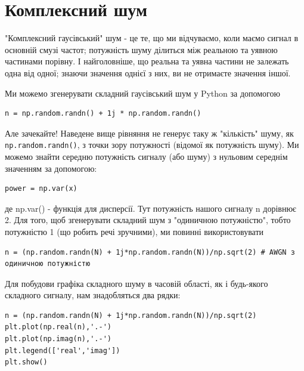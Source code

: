 \section{Комплексний
шум}\label{ux43aux43eux43cux43fux43bux435ux43aux441ux43dux438ux439-ux448ux443ux43c}

"Комплексний гаусівський" шум - це те, що ми відчуваємо, коли маємо
сигнал в основній смузі частот; потужність шуму ділиться між реальною та
уявною частинами порівну. І найголовніше, що реальна та уявна частини не
залежать одна від одної; знаючи значення однієї з них, ви не отримаєте
значення іншої.

Ми можемо згенерувати складний гаусівський шум у Python за допомогою

\begin{Verbatim}[breaklines=true,breakanywhere=true,fontsize=\small]
n = np.random.randn() + 1j * np.random.randn()
\end{Verbatim}

Але зачекайте! Наведене вище рівняння не генерує таку ж "кількість"
шуму, як \texttt{np.random.randn()}, з точки зору потужності (відомої як
потужність шуму). Ми можемо знайти середню потужність сигналу (або шуму)
з нульовим середнім значенням за допомогою:

\begin{Verbatim}[breaklines=true,breakanywhere=true,fontsize=\small]
power = np.var(x)
\end{Verbatim}

де np.var() - функція для дисперсії. Тут потужність нашого сигналу n
дорівнює 2. Для того, щоб згенерувати складний шум з "одиничною
потужністю", тобто потужністю 1 (що робить речі зручними), ми повинні
використовувати

\begin{Verbatim}[breaklines=true,breakanywhere=true,fontsize=\small]
n = (np.random.randn(N) + 1j*np.random.randn(N))/np.sqrt(2) # AWGN з одиничною потужністю
\end{Verbatim}

Для побудови графіка складного шуму в часовій області, як і будь-якого
складного сигналу, нам знадобляться два рядки:

\begin{Verbatim}[breaklines=true,breakanywhere=true,fontsize=\small]
n = (np.random.randn(N) + 1j*np.random.randn(N))/np.sqrt(2)
plt.plot(np.real(n),'.-')
plt.plot(np.imag(n),'.-')
plt.legend(['real','imag'])
plt.show()
\end{Verbatim}

